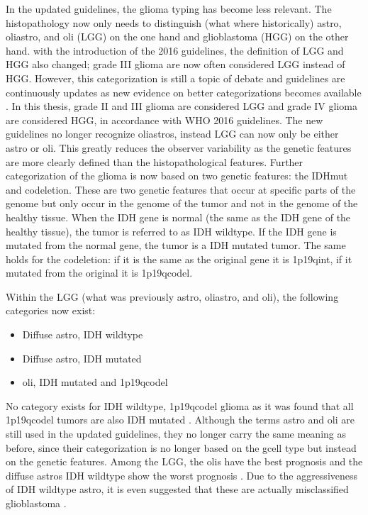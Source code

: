 In the updated guidelines, the \gls{glioma} typing has become less relevant.
The histopathology now only needs to distinguish (what where historically) \gls{astro}, \gls{oliastro}, and \gls{oli} (\gls{LGG}) on the one hand and \gls{glioblastoma} (\gls{HGG}) on the other hand.
with the introduction of the 2016 guidelines, the definition of \gls{LGG} and \gls{HGG} also changed; grade III \gls{glioma} are now often considered \gls{LGG} instead of \gls{HGG}.
However, this categorization is still a topic of debate and guidelines are continuously updates as new evidence on better categorizations becomes available \autocite{lous2020impactnow}.
In this thesis, grade II and III \gls{glioma} are considered \gls{LGG} and grade IV \gls{glioma} are considered \gls{HGG}, in accordance with \gls{WHO} 2016 guidelines.
The new guidelines no longer recognize \glspl{oliastro}, instead \gls{LGG} can now only be either \gls{astro} or \gls{oli}.
This greatly reduces the observer variability as the genetic features are more clearly defined than the histopathological features.
Further categorization of the \gls{glioma} is now based on two genetic features:  the \gls{IDHmut} and \gls{codeletion}.
These are two genetic features that occur at specific parts of the genome but only occur in the genome of the \gls{tumor} and not in the genome of the healthy tissue.
When the \gls{IDH} gene is normal (the same as the \gls{IDH} gene of the healthy tissue), the \gls{tumor} is referred to as \gls{IDH} wildtype.
If the \gls{IDH} gene is mutated from the normal gene, the \gls{tumor} is a \gls{IDH} mutated \gls{tumor}.
The same holds for the \gls{codeletion}: if it is the same as the original gene it is \acl{1p19qint}, if it mutated from the original it is \acl{1p19qcodel}.

Within the \gls{LGG} (what was previously \gls{astro}, \gls{oliastro}, and \gls{oli}), the following categories now exist:
\begin{itemize}
    \item Diffuse \gls{astro}, \gls{IDH} wildtype
    \item Diffuse \gls{astro}, \gls{IDH} mutated
    \item \Gls{oli}, \gls{IDH} mutated and \acl{1p19qcodel}
\end{itemize}
No category exists for \gls{IDH} wildtype, \acl{1p19qcodel} \gls{glioma} as it was found that all \acl{1p19qcodel} \glspl{tumor} are also \gls{IDH} mutated \autocite{labussi20101p19qcodeletedIDH}.
Although the terms \gls{astro} and \gls{oli} are still used in the updated guidelines, they no longer carry the same meaning as before, since their categorization is no longer based on the \gls{gcell} type but instead on the genetic features.
Among the \gls{LGG}, the \glspl{oli} have the best prognosis and the diffuse \glspl{astro} \gls{IDH} wildtype show the worst prognosis \autocite{eckel2015gliomagroups}.
Due to the aggressiveness of \gls{IDH} wildtype \gls{astro}, it is even suggested that these are actually misclassified \gls{glioblastoma} \autocite{hartmann2010IDH1gbm, brat2018IMPACT}.




